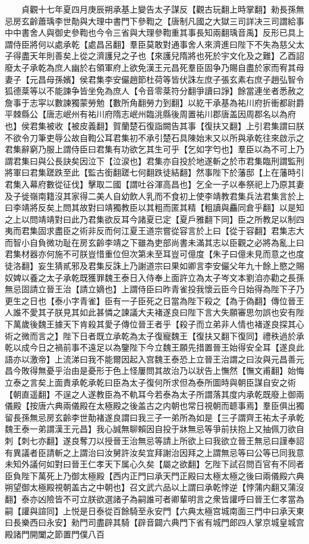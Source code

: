 　　貞觀十七年夏四月庚辰朔承基上變告太子謀反【觀古玩翻上時掌翻】勑長孫無忌房玄齡蕭瑀李世勣與大理中書門下參鞫之【唐制凡國之大獄三司詳决三司謂給事中中書舍人與御史參鞫也今令三省與大理參鞫重其事長知兩翻瑀音禹】反形已具上謂侍臣將何以處承乾【處昌呂翻】羣臣莫敢對通事舍人來濟進曰陛下不失為慈父太子得盡天年則善矣上從之濟護兒之子也【來護兒隋將也死於宇文化及之難】乙酉詔廢太子承乾為庶人幽於右領軍府上欲免漢王元昌死羣臣固争乃賜自盡於家而宥其母妻子【元昌母孫嬪】侯君集李安儼趙節杜荷等皆伏誅左庶子張玄素右庶子趙弘智令狐德棻等以不能諫争皆坐免為庶人【令音零棻符分翻爭讀曰諍】餘當連坐者悉赦之詹事于志寜以數諫獨蒙勞勉【數所角翻勞力到翻】以紇干承基為祐川府折衝都尉爵平棘縣公【唐志岷州有祐川府隋志岷州臨洮縣後周置祐川郡唐盖因周郡名以為府也】侯君集被收【被皮義翻】賀蘭楚石復詣闕告其事【復扶又翻】上引君集謂曰朕不欲令刀筆吏辱公故自鞫公耳君集初不承引楚石具陳始末又以所與承乾往來啟示之君集辭窮乃服上謂侍臣曰君集有功欲乞其生可乎【乞如字匄也】羣臣以為不可上乃謂君集曰與公長訣矣因泣下【泣涙也】君集亦自投於地遂斬之於市君集臨刑謂監刑將軍曰君集蹉跌至此【監古銜翻蹉七何翻跌徒結翻】然事陛下於藩邸【上在藩時引君集入幕府數從征伐】擊取二國【謂吐谷渾高昌也】乞全一子以奉祭祀上乃原其妻及子徙嶺南籍沒其家得二美人自幼飲人乳而不食初上使李靖教君集兵法君集言於上曰李靖將反矣上問其故對曰靖獨教臣以其粗而匿其精【粗讀與麤同倉乎翻】以是知之上以問靖靖對曰此乃君集欲反耳今諸夏已定【夏戶雅翻下同】臣之所教足以制四夷而君集固求盡臣之術非反而何江夏王道宗嘗從容言於上曰【從于容翻】君集志大而智小自負微功耻在房玄齡李靖之下雖為吏部尚書未滿其志以臣觀之必將為亂上曰君集材器亦何施不可朕豈惜重位但次第未至耳豈可億度【朱子曰億未見而意之也度徒洛翻】妄生猜貳邪及君集反誅上乃謝道宗曰果如卿言李安儼父年九十餘上愍之賜奴婢以養之太子承乾既獲罪魏王泰日入侍奉上面許立為太子岑文本劉洎亦勸之長孫無忌固請立晉王治【請立嫡也】上謂侍臣曰昨青雀投我懷云臣今日始得為陛下子乃更生之日也【泰小字青雀】臣有一子臣死之日當為陛下殺之【為于偽翻】傳位晉王人誰不愛其子朕見其如此甚憐之諫議大夫褚遂良曰陛下言大失願審思勿誤也安有陛下萬歲後魏王據天下肯殺其愛子傳位晉王者乎【殺子而立弟非人情也褚遂良探其心術之微而言之】陛下日者既立承乾為太子復寵魏王【復扶又翻下復同】禮秩過於承乾以成今日之禍前事不遠足以為鑒陛下今立魏王願先措置晉王始得安全耳【遂良此語亦以激帝】上流涕曰我不能爾因起入宫魏王泰恐上立晉王治謂之曰汝與元昌善元昌今敗得無憂乎治由是憂形于色上怪屢問其故治乃以狀告上憮然【憮文甫翻】始悔立泰之言矣上面責承乾承乾曰臣為太子復何所求但為泰所圖時與朝臣謀自安之術【朝直遥翻】不逞之人遂教臣為不軌耳今若泰為太子所謂落其度内承乾既廢上御兩儀殿【按唐六典兩儀殿在太極殿之後盖古之内朝也常日視朝而聼事焉】羣臣俱出獨留長孫無忌房玄齡李世勣褚遂良謂曰我三子一弟所為如是【三子謂齊王祐太子承乾魏王泰一弟謂漢王元昌】我心誠無聊賴因自投于牀無忌等爭前扶抱上又抽佩刀欲自刺【刺七亦翻】遂良奪刀以授晉王治無忌等請上所欲上曰我欲立晉王無忌曰謹奉詔有異議者臣請斬之上謂治曰汝舅許汝矣宜拜謝治因拜之上謂無忌等曰公等已同我意未知外議何如對曰晉王仁孝天下属心久矣【屬之欲翻】乞陛下試召問百官有不同者臣負陛下萬死上乃御太極殿【西内正門曰承天門正殿曰太極太極之後曰兩儀殿六典朔望御太極殿視朝盖古之中朝也】召文武六品以上謂曰承乾悖逆【悖蒲内翻又蒲沒翻】泰亦凶險皆不可立朕欲選諸子為嗣誰可者卿輩明言之衆皆讙呼曰晉王仁孝當為嗣【讙與諠同】上悦是日泰從百餘騎至永安門【六典太極宫城南面三門中曰承天東曰長樂西曰永安】勑門司盡辟其騎【辟音闢六典門下省有城門郎四人掌京城皇城宫殿諸門開闔之節置門僕八百